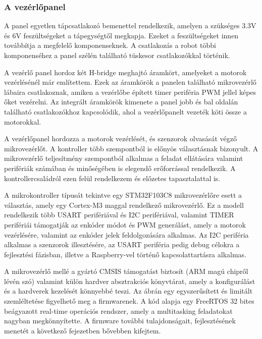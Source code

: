 \subsubsection{A vezérlőpanel}

A panel egyetlen tápcsatlakozó bemenettel rendelkezik, amelyen a szükséges 3.3V
és 6V feszültségeket a tápegységtől megkapja. Ezeket a feszültségeket innen
továbbítja a megfelelő komponenseknek. A csatlakozás a robot többi komponenséhez
a panel szélén található tüskesor csatlakozókkal történik.

\medskip

A vezérlő panel hordoz két H-bridge meghajtó áramkört, amelyeket a motorok
vezérlésénél már említettem. Ezek az áramkörök a panelen található mikrovezérlő
lábaira csatlakoznak, amiken a vezérlőbe épített timer periféria PWM jellel képes
őket vezérelni. Az integrált áramkörök kimenete a panel jobb és bal oldalán
található csatlakozókhoz kapcsolódik, ahol a vezérlőpanelt vezeték köti össze a
motorokkal.

\medskip

A vezérlőpanel hordozza a motorok vezérlését, és szenzorok olvasását végző
mikrovezérlőt. A kontroller több szempontból is előnyös választásnak bizonyult. A
mikrovezérlő teljesítmény szempontból alkalmas a feladat ellátására valamint
perifériák számában és minőségében is elegendő erőforrással rendelkezik. A
kontrollercsaládról ezen felül rendelkezem és előzetes tapasztalattal is.

A mikrokontroller típusát tekintve egy STM32F103C8 mikrovezérlőre esett a
választás, amely egy Cortex-M3 maggal rendelkező mikrovezérlő. Ez a modell
rendelkezik több USART perifériával és I2C perifériával, valamint TIMER
perifériái támogatják az enkóder módot és PWM generálást, amely a motorok
vezérlésére, valamint az enkóder jelek feldolgozására alkalmas. Az I2C periféria
alkalmas a szenzorok illesztésére, az USART periféria pedig debug célokra a
fejlesztési fázisban, illetve a Raspberry-vel történő kapcsolattartásra alkalmas.

A mikrovezérlő mellé a gyártó CMSIS támogatást biztosít (ARM magú chipről lévén
szó) valamint külön hardver absztrakciós könyvtárat, amely a konfigurálást és a
hardverek kezelését könnyebbé teszi. Az ábrán egy egyszerűsített és limitált
szemléltetése figyelhető meg a firmwarenek. A kód alapja egy FreeRTOS 32 bites
beágyazott real-time operációs rendszer, amely a multitasking feladatokat nagyban
megkönnyítette. A firmware további tulajdonságait, fejlesztésének menetét a
következő fejezetben bővebben kifejtem.


